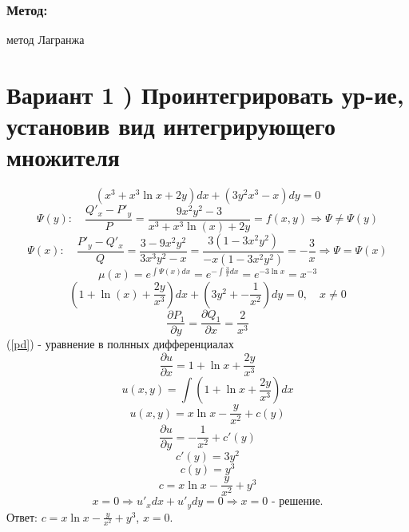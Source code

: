 \documentclass[a4paper]{article}
\begin{document}
\subsubsection*{Метод:}
метод Лагранжа

\section*{Вариант 1 ) Проинтегрировать ур-ие, установив вид интегрирующего множителя}
\begin{equation*}
(x^3+x^3\ln{x}+2y)dx+(3y^2x^3-x)dy=0
\end{equation*}
\begin{equation*}
\Psi(y): \quad \frac{Q'_x-P'_y}{P}=
\frac{9x^2y^2-3}{x^3+x^3\ln(x)+2y}=f(x,y) \Rightarrow \Psi\neq\Psi(y)
\end{equation*}
\begin{equation*}
\Psi(x): \quad \frac{P'_y-Q'_x}{Q}=
\frac{3-9x^2y^2}{3x^3y^2-x}=
\frac{3(1-3x^2y^2)}{-x(1-3x^2y^2)}=-\frac{3}{x}
\Rightarrow \Psi=\Psi(x)
\end{equation*}
\begin{equation*}
\mu(x)=e^{\int\Psi(x)dx}=e^{-\int\frac{3}{x}dx}=e^{-3\ln x}=x^{-3}
\end{equation*}
\begin{equation}
\left(1+\ln(x)+\frac{2y}{x^3}\right)dx+\left(3y^2+-\frac{1}{x^2}\right)dy=0 \label{pd},\quad x\neq0
\end{equation}
\begin{equation*}
\frac{\partial P_1}{\partial y}=\frac{\partial Q_1}{\partial x}=\frac{2}{x^3}
\end{equation*}
(\ref{pd}) - уравнение в полнных дифференциалах
\begin{equation*}
\frac{\partial u}{\partial x} = 1+\ln x+\frac{2y}{x^3}
\end{equation*}
\begin{equation*}
u(x,y)= \int \left(1+\ln x+\frac{2y}{x^3}\right)dx
\end{equation*}
\begin{equation*}
u(x,y)= x\ln x-\frac{y}{x^2}+c(y)
\end{equation*}
\begin{equation*}
\frac{\partial u}{\partial y} = -\frac{1}{x^2}+c'(y)
\end{equation*}
\begin{equation*}
c'(y)=3y^2
\end{equation*}
\begin{equation*}
c(y)=y^3
\end{equation*}
\begin{equation*}
c=x\ln x-\frac{y}{x^2}+y^3
\end{equation*}
\begin{equation*}
x=0 \Rightarrow u'_xdx+u'_ydy=0 \Rightarrow x=0\text{ - решение.}
\end{equation*}
Ответ: $c=x\ln x-\frac{y}{x^2}+y^3$,
$x=0$.
\end{document}
